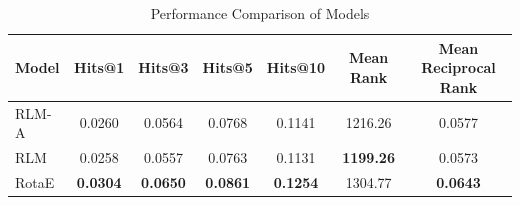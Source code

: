 \begin{table}
\centering
\caption{Performance Comparison of Models}
\label{tab:models_performance_comparison}
\begin{tabular}{@{}lcccccc@{}}
\toprule
\textbf{Model} & \textbf{Hits@1} & \textbf{Hits@3} & \textbf{Hits@5} & \textbf{Hits@10} & \textbf{Mean Rank} & \textbf{Mean Reciprocal Rank} \\ \midrule
RLM-A          & 0.0260          & 0.0564          & 0.0768          & 0.1141           & 1216.26            & 0.0577                        \\
RLM            & 0.0258          & 0.0557          & 0.0763          & 0.1131           & \textbf{1199.26}   & 0.0573                        \\
RotaE          & \textbf{0.0304} & \textbf{0.0650} & \textbf{0.0861} & \textbf{0.1254}  & 1304.77            & \textbf{0.0643}               \\ \bottomrule
\end{tabular}
\end{table}


